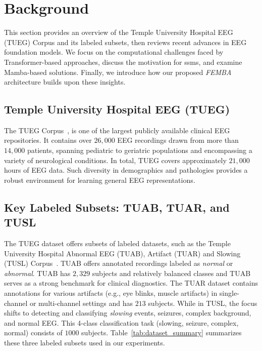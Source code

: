 \section{Background}\label{sec:related}
This section provides an overview of the Temple University Hospital EEG (TUEG) Corpus and its labeled subsets, then reviews recent advances in EEG foundation models. We focus on the computational challenges faced by Transformer-based approaches, discuss the motivation for \glspl{ssm}, and examine Mamba-based solutions. Finally, we introduce how our proposed \emph{FEMBA} architecture builds upon these insights.

\subsection{Temple University Hospital EEG (TUEG)}\label{sec:TUEG}
The TUEG Corpus~\cite{obeid2016temple}, is one of the largest publicly available clinical EEG repositories. It contains over $26{,}000$ EEG recordings drawn from more than $14{,}000$ patients, spanning pediatric to geriatric populations and encompassing a variety of neurological conditions. In total, TUEG covers approximately $21{,}000$ hours of EEG data. Such diversity in demographics and pathologies provides a robust environment for learning general EEG representations.

\subsection{Key Labeled Subsets: TUAB, TUAR, and TUSL}\label{sec:datasets_finetune}
The TUEG dataset offers subsets of labeled datasets, such as the Temple University Hospital Abnormal EEG (TUAB), Artifact (TUAR) and Slowing (TUSL) Corpus~\cite{obeid2016temple}. TUAB offers annotated recordings labeled as \emph{normal} or \emph{abnormal}. TUAB has $2,329$ subjects and relatively balanced classes and TUAB serves as a strong benchmark for clinical diagnostics. The TUAR dataset contains annotations for various artifacts (e.g., eye blinks, muscle artifacts) in single-channel or multi-channel settings and has $213$ subjects. While in TUSL, the focus shifts to detecting and classifying \emph{slowing} events, seizures, complex background, and normal EEG. This 4-class classification task (slowing, seizure, complex, normal) consists of $1000$ subjects. Table~\ref{tab:dataset_summary} summarizes these three labeled subsets used in our experiments.


